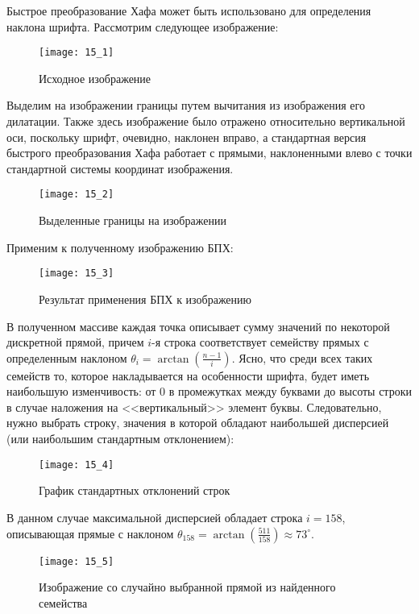 
Быстрое преобразование Хафа может быть использовано для определения наклона шрифта. Рассмотрим следующее изображение:
\begin{figure}[!h]
    \centering
    \texttt{[image: 15\_1]}
    \caption{Исходное изображение}
\end{figure}

Выделим на изображении границы путем вычитания из изображения его дилатации. Также здесь изображение было отражено относительно вертикальной оси, поскольку шрифт, очевидно, наклонен вправо, а стандартная версия быстрого преобразования Хафа работает с прямыми, наклоненными влево с точки стандартной системы координат изображения.
\begin{figure}[!h]
    \centering
    \texttt{[image: 15\_2]}
    \caption{Выделенные границы на изображении}
\end{figure}

Применим к полученному изображению БПХ:
\begin{figure}[!h]
    \centering
    \texttt{[image: 15\_3]}
    \caption{Результат применения БПХ к изображению}
\end{figure}

В полученном массиве каждая точка описывает сумму значений по некоторой дискретной прямой, причем $i$-я строка соответствует семейству прямых с определенным наклоном $\theta_i = \arctan\left( \frac{n-1}{i} \right)$. Ясно, что среди всех таких семейств то, которое накладывается на особенности шрифта, будет иметь наибольшую изменчивость: от 0 в промежутках между буквами до высоты строки в случае наложения на <<вертикальный>> элемент буквы. Следовательно, нужно выбрать строку, значения в которой обладают наибольшей дисперсией (или наибольшим стандартным отклонением):
\begin{figure}[!h]
    \centering
    \texttt{[image: 15\_4]}
    \caption{График стандартных отклонений строк}
\end{figure}

В данном случае максимальной дисперсией обладает строка $i=158$, описывающая прямые с наклоном $\theta_{158} = \arctan\left( \frac{511}{158} \right) \approx 73^{\circ}$.
\begin{figure}[!h]
    \centering
    \texttt{[image: 15\_5]}
    \caption{Изображение со случайно выбранной прямой из найденного семейства}
\end{figure}
